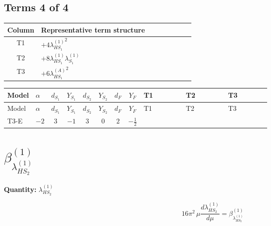 \documentclass[8pt]{article}
\begin{document}
\begin{landscape}
\subsection*{Terms 4 of 4}
\begin{center}
\begin{tabular}{@{}c >{\raggedright\arraybackslash}p{0.82\linewidth}@{}}
\toprule
Column & Representative term structure \\
\midrule
T1 & \(\displaystyle +4 {\lambda_{HS_1}^{(1)}}^2\) \\
\midrule
T2 & \(\displaystyle +8 {\lambda_{HS_1}^{(1)}} {\lambda_{S_1}^{(1)}}\) \\
\midrule
T3 & \(\displaystyle +6 {\lambda_{HS_1}^{(A)}}^2\) \\
\midrule
\bottomrule
\end{tabular}
\end{center}
\smallskip
\tiny
\begin{longtable}{@{}llcccccc >{\raggedright\arraybackslash}p{0.21\linewidth} >{\raggedright\arraybackslash}p{0.21\linewidth} >{\raggedright\arraybackslash}p{0.21\linewidth}@{}}
\toprule
Model & $\alpha$ & $d_{S_1}$ & $Y_{S_1}$ & $d_{S_2}$ & $Y_{S_2}$ & $d_F$ & $Y_F$ & T1 & T2 & T3 \\
\midrule
\endfirsthead
\toprule
Model & $\alpha$ & $d_{S_1}$ & $Y_{S_1}$ & $d_{S_2}$ & $Y_{S_2}$ & $d_F$ & $Y_F$ & T1 & T2 & T3 \\
\midrule
\endhead
T3-E & $-2$ & $3$ & $-1$ & $3$ & $0$ & $2$ & $-\frac{1}{2}$ & \scriptsize\adjustbox{max width=\linewidth}{$\begin{gathered} +4 {\lambda_{HS_1}^{(1)}}^2\end{gathered}$} & \scriptsize\adjustbox{max width=\linewidth}{$\begin{gathered} +8 {\lambda_{HS_1}^{(1)}} {\lambda_{S_1}^{(1)}}\end{gathered}$} & \scriptsize\adjustbox{max width=\linewidth}{$\begin{gathered} +6 {\lambda_{HS_1}^{(A)}}^2\end{gathered}$} \\
\midrule
\bottomrule
\end{longtable}
\clearpage
\section*{$\beta_{\lambda_{HS_2}^{(1)}}^{(1)}$}
\noindent\textbf{Quantity: }$\lambda_{HS_2}^{(1)}$\par\smallskip
\[16\pi^2\,\mu\frac{d \lambda_{HS_2}^{(1)}}{d\mu}=\beta_{\lambda_{HS_2}^{(1)}}^{(1)}\]

\end{landscape}
\end{document}
